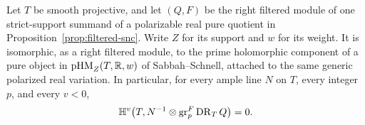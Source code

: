 \begin{lemma}\label{lem:real-pure-vanishing}
Let \(T\) be smooth projective, and let \((Q,F)\) be the right filtered
module of one strict-support summand of a polarizable real pure quotient
in Proposition~\ref{prop:filtered-snc}.  Write \(Z\) for its support and
\(w\) for its weight.  It is isomorphic, as a right filtered module, to
the prime holomorphic component of a pure object in
\(\mathrm{pHM}_Z(T,\mathbb R,w)\) of Sabbah--Schnell, attached to the same
generic polarized real variation.  In particular, for every ample line
\(N\) on \(T\), every integer \(p\), and every \(v<0\),
\begin{equation}\label{eq:real-negative-vanishing}
 \mathbb H^v\bigl(T,N^{-1}\otimes\operatorname{gr}^F_p\operatorname{DR}_T Q\bigr)=0.
\end{equation}
\end{lemma}
